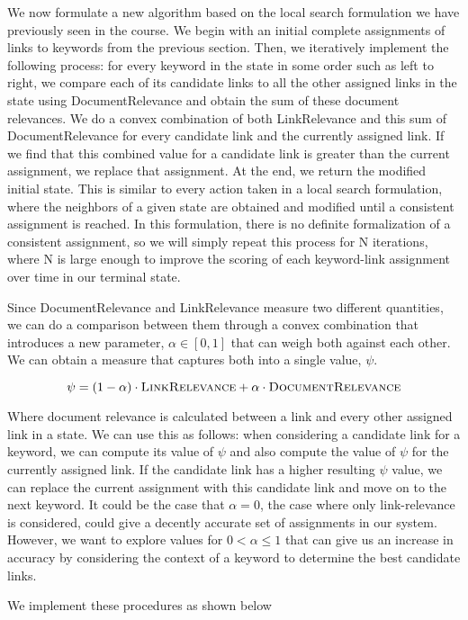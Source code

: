 \documentclass[twoside,11pt]{article}
\begin{document}
We now formulate a new algorithm based on the local search formulation we have previously seen in the course. We begin with an initial complete assignments of links to keywords from the previous section. Then, we iteratively implement the following process: for every keyword in the state in some order such as left to right, we compare each of its candidate links to all the other assigned links in the state using {\sc DocumentRelevance} and obtain the sum of these document relevances. We do a convex combination of both {\sc LinkRelevance} and this sum of {\sc DocumentRelevance} for every candidate link and the currently assigned link. If we find that this combined value for a candidate link is greater than the current assignment, we replace that assignment. At the end, we return the modified initial state. This is similar to every action taken in a local search formulation, where the neighbors of a given state are obtained and modified until a consistent assignment is reached. In this formulation, there is no definite formalization of a consistent assignment, so we will simply repeat this process for N iterations, where N is large enough to improve the scoring of each keyword-link assignment over time in our terminal state.

Since {\sc DocumentRelevance} and {\sc LinkRelevance} measure two different quantities, we can do a comparison between them through a convex combination that introduces a new parameter, $\alpha \in [0, 1]$ that can weigh both against each other. We can obtain a measure that captures both into a single value, $\psi$.

$$ \psi = (1-\alpha)\cdot\mbox{\sc LinkRelevance} + \alpha\cdot\mbox{\sc DocumentRelevance}$$

Where document relevance is calculated between a link and every other assigned link in a state. We can use this as follows: when considering a candidate link for a keyword, we can compute its value of $\psi$ and also compute the value of $\psi$ for the currently assigned link. If the candidate link has a higher resulting $\psi$ value, we can replace the current assignment with this candidate link and move on to the next keyword. It could be the case that $\alpha = 0$, the case where only link-relevance is considered, could give a decently accurate set of assignments in our system. However, we want to explore values for $0 < \alpha \leq 1$ that can give us an increase in accuracy by considering the context of a keyword to determine the best candidate links.

We implement these procedures as shown below
\end{document}
